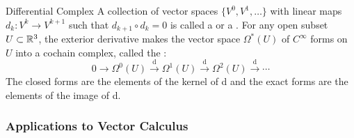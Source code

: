 \begin{definition}{Differential Complex}{}
    A collection of vector spaces \(\{V^0, V^1, \dots\}\) with linear maps \(d_k \colon V^k \rightarrow V^{k+1}\) such that \(d_{k+1} \circ d_k = 0\) is called a  or a . For any open subset \(U \subset \mathbb{R}^3\), the exterior derivative makes the vector space \(\Omega^*(U)\) of \(C^\infty\) forms on \(U\) into a cochain complex, called the :
    \[
        0 \rightarrow \Omega^0(U) \xrightarrow{\text{ d }} \Omega^1(U) \xrightarrow{\text{ d }} \Omega^2(U) \xrightarrow{\text{ d }} \cdots
    \]
    The closed forms are the elements of the kernel of d and the exact forms are the elements of the image of d.
\end{definition}

\subsubsection{Applications to Vector Calculus}

